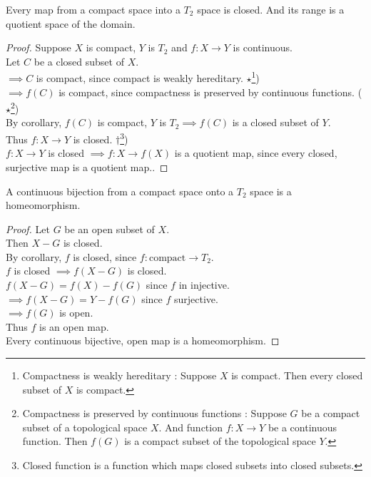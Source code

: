\begin{corollary}
	Every map from a compact space into a $T_2$ space is closed. And its range is a quotient space of the domain.
\end{corollary}
\begin{proof}
	 Suppose $X$ is compact, $Y$ is $T_2$ and $f : X \to Y$ is continuous.\\
	Let $C$ be a closed subset of $X$.\\
	$\implies C$ is compact, since compact is weakly hereditary.
	$\star$\footnote{Compactness is weakly hereditary : Suppose $X$ is compact.
	Then every closed subset of $X$ is compact.})\\
	$\implies f(C)$ is compact, since compactness is preserved by continuous functions.
	($\star$\footnote{Compactness is preserved by continuous functions : Suppose $G$ be a compact subset of a topological space $X$.
	And function $f: X \to Y$ be a continuous function.
	Then $f(G)$ is a compact subset of the topological space $Y$.\cite[6.1.8]{joshi}})\\
	 By corollary, $f(C)$ is compact, $Y$ is $T_2\implies f(C)$ is a closed subset of $Y$.\\
	Thus $f : X \to Y$ is closed.
	$\dag$\footnote{Closed function is a function which maps closed subsets into closed subsets.})\\
	 $f : X \to Y$ is closed $\implies f : X \to f(X)$ is a quotient map, since every closed, surjective map is a quotient map..
\end{proof}

\begin{corollary}
	A continuous bijection from a compact space onto a $T_2$ space is a homeomorphism.
\end{corollary}
\begin{proof}
	Let $G$ be an open subset of $X$.\\
	Then $X-G$ is closed.\\
	By corollary, $f$ is closed, since $f : \text{compact} \to T_2$.\\
	$f$ is closed $\implies f(X-G)$ is closed.\\
	$f(X-G) = f(X)-f(G)$ since $f$ in injective.\\
	$\implies f(X-G) = Y - f(G)$ since $f$ surjective.\\
	$\implies f(G)$ is open.\\
	Thus $f$ is an open map.\\
	Every continuous bijective, open map is a homeomorphism.
\end{proof}

